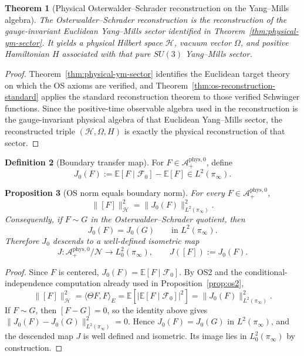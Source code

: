 \documentclass[11pt]{article}
\newtheorem{theorem}{Theorem}[section]
\newtheorem{proposition}[theorem]{Proposition}
\theoremstyle{definition}
\newtheorem{definition}[theorem]{Definition}
\theoremstyle{remark}
\newcommand{\mcA}{\mathcal A}
\newcommand{\mcH}{\mathcal H}
\newcommand{\mcN}{\mathcal N}
\begin{document}
\begin{theorem}[Physical Osterwalder--Schrader reconstruction on the Yang--Mills algebra]
\label{thm:physical-os-reconstruction}
The Osterwalder--Schrader reconstruction is the
reconstruction of the gauge-invariant Euclidean Yang--Mills sector identified
in Theorem~\ref{thm:physical-ym-sector}.  It yields a physical Hilbert space
\(\mcH\), vacuum vector \(\Omega\), and positive Hamiltonian \(H\) associated
with that pure \(SU(3)\) Yang--Mills sector.
\end{theorem}

\begin{proof}
Theorem~\ref{thm:physical-ym-sector} identifies the Euclidean target theory on
which the OS axioms are verified, and Theorem~\ref{thm:os-reconstruction-standard}
applies the standard reconstruction theorem to those verified Schwinger
functions.  Since the positive-time observable algebra used in the
reconstruction is the gauge-invariant physical algebra of that Euclidean
Yang--Mills sector, the reconstructed triple \((\mcH,\Omega,H)\) is exactly
the physical reconstruction of that sector.
\end{proof}

\begin{definition}[Boundary transfer map]
\label{def:boundary-map}
For \(F\in\mcA^{\mathrm{phys},0}_+\), define
\[
J_0(F):=\mathbb E[F\mid\mathcal F_0]-\mathbb E[F]\in L^2(\pi_\infty).
\]
\end{definition}

\begin{proposition}[OS norm equals boundary norm]
\label{prop:j-isometry}
For every \(F\in\mcA^{\mathrm{phys},0}_+\),
\[
\|[F]\|_{\mcH}^2
=
\|J_0(F)\|_{L^2(\pi_\infty)}^2.
\]
Consequently, if \(F\sim G\) in the Osterwalder--Schrader quotient, then
\[
J_0(F)=J_0(G)
\qquad
\text{in }L^2(\pi_\infty).
\]
Therefore \(J_0\) descends to a well-defined isometric map
\[
J:\mcA^{\mathrm{phys},0}_+/\mcN\longrightarrow L^2_0(\pi_\infty),
\qquad
J([F]):=J_0(F).
\]
\end{proposition}

\begin{proof}
Since \(F\) is centered, \(J_0(F)=\mathbb E[F\mid\mathcal F_0]\).  By OS2 and
the conditional-independence computation already used in
Proposition~\ref{prop:os2},
\[
\|[F]\|_{\mcH}^2
=
\langle \Theta F,F\rangle_E
=
\mathbb E\!\left[\left|\mathbb E[F\mid\mathcal F_0]\right|^2\right]
=
\|J_0(F)\|_{L^2(\pi_\infty)}^2.
\]
If \(F\sim G\), then \([F-G]=0\), so the identity above gives
\(\|J_0(F)-J_0(G)\|_{L^2(\pi_\infty)}^2=0\).  Hence \(J_0(F)=J_0(G)\) in
\(L^2(\pi_\infty)\), and the descended map \(J\) is well defined and isometric.
Its image lies in \(L^2_0(\pi_\infty)\) by construction.
\end{proof}
\end{document}
